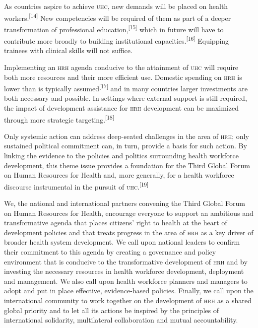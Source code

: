 \documentclass{article}
\begin{document}
As countries aspire to achieve \textsc{uhc}, new demands will be placed on health
workers.\textsuperscript{[}\textsuperscript{14}\textsuperscript{]}
New competencies will be required of them as part of
a deeper transformation of professional
education,\textsuperscript{[}\textsuperscript{15}\textsuperscript{]}
which in future will have to contribute more broadly to building institutional
capacities.\textsuperscript{[}\textsuperscript{16}\textsuperscript{]}
Equipping trainees with clinical
skills will not suffice.

Implementing an \textsc{hrh} agenda conducive to the attainment of \textsc{uhc} will require both
more resources
and their more efficient use. Domestic spending on \textsc{hrh} is lower than is
typically assumed\textsuperscript{[}\textsuperscript{17}\textsuperscript{]}
and in many countries larger investments are both
necessary and possible. In settings where external support is still required,
the impact of
development assistance for \textsc{hrh} development can be maximized through more
strategic targeting.\textsuperscript{[}\textsuperscript{18}\textsuperscript{]}

Only systemic action can address deep-seated challenges in the area of \textsc{hrh}; only
sustained
political commitment can, in turn, provide a basis for such action. By linking
the evidence to the
policies and politics surrounding health workforce development, this theme issue
provides a
foundation for the Third Global Forum on Human Resources for Health and, more
generally, for a
health workforce discourse instrumental in the pursuit of
\textsc{uhc}.\textsuperscript{[}\textsuperscript{19}\textsuperscript{]}

We, the national and international partners convening the Third Global Forum on
Human Resources
for Health, encourage everyone to support an ambitious and transformative agenda
that places
citizens' right to health at the heart of development policies and that treats
progress in
the area of \textsc{hrh} as a key driver of broader health system development. We call
upon national leaders
to confirm their commitment to this agenda by creating a governance and policy
environment that is
conducive to the transformative development of \textsc{hrh} and by investing the
necessary resources in
health workforce development, deployment and management. We also call upon
health workforce planners
and managers to adopt and put in place effective, evidence-based policies.
Finally, we call upon the
international community to work together on the development of \textsc{hrh} as a shared
global priority and
to let all its actions be inspired by the principles of international
solidarity, multilateral
collaboration and mutual accountability.
\end{document}
